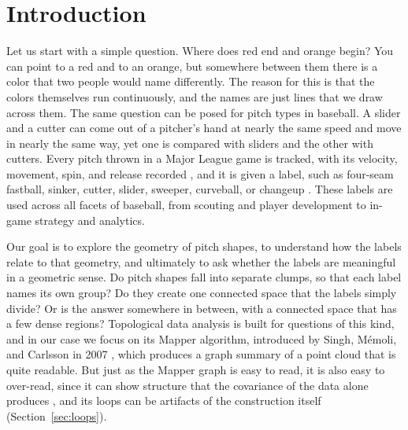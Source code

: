 \documentclass[11pt]{article}
\theoremstyle{definition}
\theoremstyle{remark}
\begin{document}
\section{Introduction}
Let us start with a simple question.
Where does red end and orange begin?
You can point to a red and to an orange, but somewhere between them there is a color that two people would name differently.
The reason for this is that the colors themselves run continuously, and the names are just lines that we draw across them.
The same question can be posed for pitch types in baseball.
A slider and a cutter can come out of a pitcher's hand at nearly the same speed and move in nearly the same way, yet one is compared with sliders and the other with cutters.
Every pitch thrown in a Major League game is tracked, with its velocity, movement, spin, and release recorded \parencite{savantcsvdocs}, and it is given a label, such as four-seam fastball, sinker, cutter, slider, sweeper, curveball, or changeup \parencite{mlbglossary_pitchtypes}.
These labels are used across all facets of baseball, from scouting and player development to in-game strategy and analytics.

Our goal is to explore the geometry of pitch shapes, to understand how the labels relate to that geometry, and ultimately to ask whether the labels are meaningful in a geometric sense.
Do pitch shapes fall into separate clumps, so that each label names its own group?
Do they create one connected space that the labels simply divide?
Or is the answer somewhere in between, with a connected space that has a few dense regions?
Topological data analysis is built for questions of this kind, and in our case we focus on its Mapper algorithm, introduced by Singh, M\'emoli, and Carlsson in 2007 \parencite{singh2007mapper}, which produces a graph summary of a point cloud that is quite readable.
But just as the Mapper graph is easy to read, it is also easy to over-read, since it can show structure that the covariance of the data alone produces \parencite{topaz2026null}, and its loops can be artifacts of the construction itself (Section~\ref{sec:loops}).
\end{document}
